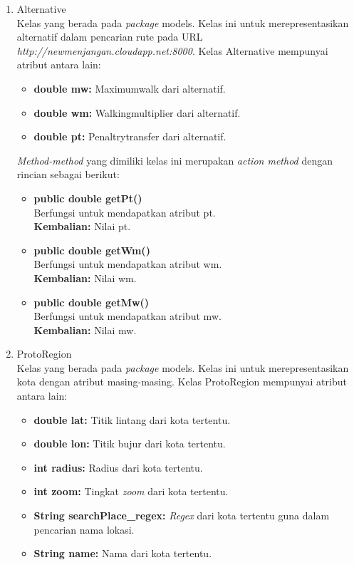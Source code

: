 \begin{enumerate}
	
	\item Alternative\\
	Kelas yang berada pada \textit{package} models. Kelas ini untuk merepresentasikan alternatif dalam pencarian rute pada URL \textit{http://newmenjangan.cloudapp.net:8000}. Kelas Alternative mempunyai atribut antara lain:
	\begin{itemize}
		\item \textbf{double mw:} Maximumwalk dari alternatif.
		\item \textbf{double wm:} Walkingmultiplier dari alternatif.
		\item \textbf{double pt:}  Penaltrytransfer dari alternatif.
	\end{itemize}
	
	\textit{Method-method} yang dimiliki kelas ini merupakan \textit{action method} dengan rincian sebagai berikut:
	\begin{itemize}
		\item \textbf{public double getPt()}\\
		Berfungsi untuk mendapatkan atribut pt.\\
		\textbf{Kembalian:}  Nilai pt.
		
		\item \textbf{public double getWm()}\\
		Berfungsi untuk mendapatkan atribut wm.\\
		\textbf{Kembalian:}  Nilai wm.
		
		\item \textbf{public double getMw()}\\
		Berfungsi untuk mendapatkan atribut mw.\\
		\textbf{Kembalian:}  Nilai mw.
	\end{itemize}
	
	\item ProtoRegion\\
	Kelas yang berada pada \textit{package} models. Kelas ini untuk merepresentasikan kota dengan atribut masing-masing. Kelas ProtoRegion mempunyai atribut antara lain:
	\begin{itemize}
		\item \textbf{double lat:} Titik lintang dari kota tertentu.
		\item \textbf{double lon:} Titik bujur dari kota tertentu.
		\item \textbf{int radius:}  Radius dari kota tertentu.
		\item \textbf{int zoom:}  Tingkat \textit{zoom} dari kota tertentu.
		\item \textbf{String searchPlace\_regex:}  \textit{Regex} dari kota tertentu guna dalam pencarian nama lokasi.
		\item \textbf{String name:}  Nama dari kota tertentu.
	\end{itemize}
	

\end{enumerate}

